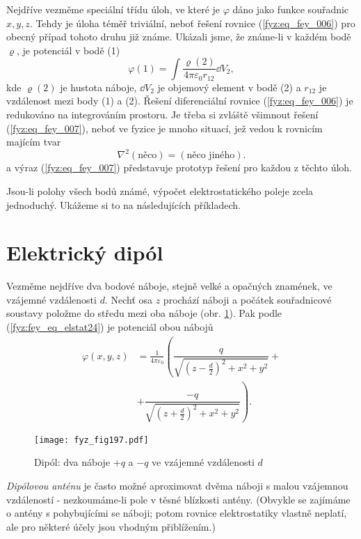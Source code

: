 {  Nejdříve vezměme speciální třídu úloh, ve které je \(\varphi\) dáno jako funkce souřadnic \(x, 
  y, z\). Tehdy je úloha téměř triviální, neboť řešení rovnice (\ref{fyz:eq_fey_006}) pro obecný 
  případ tohoto druhu již známe. Ukázali jsme, že známe-li v každém bodě \(\varrho\), je 
  potenciál v bodě (1)
  \begin{equation}\label{fyz:eq_fey_007}
  \varphi(1) = \int{\dfrac{\varrho(2)}{4\pi\varepsilon_0r_{12}}}\dd{V_2},
  \end{equation}
  kde \(\varrho(2)\) je hustota náboje, \(\dd{V_2}\) je objemový element v bodě (2) a \(r_{12}\) 
  je vzdálenost mezi body (1) a (2). Řešení diferenciální rovnice (\ref{fyz:eq_fey_006}) je 
  redukováno na integrováním prostoru. Je třeba si zvláště všimnout řešení 
  (\ref{fyz:eq_fey_007}), neboť ve fyzice je mnoho situací, jež vedou k rovnicím majícím tvar
  \begin{equation}\label{fyz:eq_fey_008}
  \nabla^2(\text{něco}) = (\text{něco jiného}).
  \end{equation}
  a výraz (\ref{fyz:eq_fey_007}) představuje prototyp řešení pro každou z těchto úloh.
  
  Jsou-li polohy všech bodů známé, výpočet elektrostatického poleje zcela jednoduchý. Ukážeme si 
  to na následujících příkladech.

\section{Elektrický dipól}\label{fyz:IIchapVsecXI}
  Vezměme nejdříve dva bodové náboje, stejně velké a opačných znamének, ve vzájemné vzdálenosti 
  \(d\). Nechť osa \(z\) prochází náboji a počátek souřadnicové soustavy položme do středu mezi 
  oba náboje (obr. \ref{fyz:fig197}). Pak podle (\ref{fyz:fey_eq_elstat24}) je potenciál obou 
  nábojů
  \begin{align}
    \varphi(x,y,z) 
      &= \frac{1}{4\pi\varepsilon_0}
         \left(\dfrac{q}{\sqrt{(z -\frac{d}{2})^2+x^2+y^2}} + \right.    \nonumber \\         
      &+ \left.\dfrac{-q}{\sqrt{(z+\frac{d}{2})^2+x^2+y^2}}\right).      \label{fyz:eq_fey_009}
  \end{align}
  \begin{figure}[ht!] %
    \centering
    \texttt{[image: fyz\_fig197.pdf]}
    \caption{Dipól: dva náboje \(+q\) a \(-q\) ve vzájemné vzdálenosti \(d\)}
    \label{fyz:fig197}
  \end{figure}
  \emph{Dipólovou anténu} je často možné aproximovat dvěma náboji s malou vzájemnou vzdáleností 
  - nezkoumáme-li pole v těsné blízkosti antény. (Obvykle se zajímáme o antény s pohybujícími se 
  náboji; potom rovnice elektrostatiky vlastně neplatí, ale pro některé účely jsou vhodným 
  přiblížením.)
  
}
